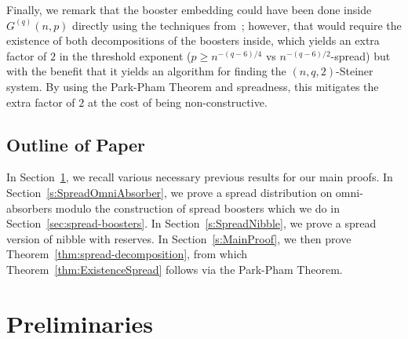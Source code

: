 \documentclass[11pt]{article}
\numberwithin{equation}{section}
\newcounter{i}
\theoremstyle{plain}
\theoremstyle{plain} %
\theoremstyle{definition}
\begin{document}
Finally, we remark that the booster embedding could have been done inside $G^{(q)}(n,p)$ directly using the techniques from~\cite{DKPIII}; however, that would require the existence of both decompositions of the boosters inside, which yields an extra factor of $2$ in the threshold exponent ($p \geq n^{-{(q - 6)}/{4}}$ vs $n^{-{(q - 6)}/{2}}$-spread) but with the benefit that it yields an algorithm for finding the $(n,q,2)$-Steiner system. By using the Park-Pham Theorem and spreadness, this mitigates the extra factor of $2$ at the cost of being non-constructive. 



\subsection{Outline of Paper}\label{ss:Outline}



In Section~\ref{s:Previous}, we recall various necessary previous results for our main proofs. In Section~\ref{s:SpreadOmniAbsorber}, we prove a spread distribution on omni-absorbers modulo the construction of spread boosters which we do in Section~\ref{sec:spread-boosters}. In Section~\ref{s:SpreadNibble}, we prove a spread version of nibble with reserves. In Section~\ref{s:MainProof}, we then prove Theorem~\ref{thm:spread-decomposition}, from which Theorem~\ref{thm:ExistenceSpread} follows via the Park-Pham Theorem. %




\section{Preliminaries}\label{s:Previous}
\end{document}
